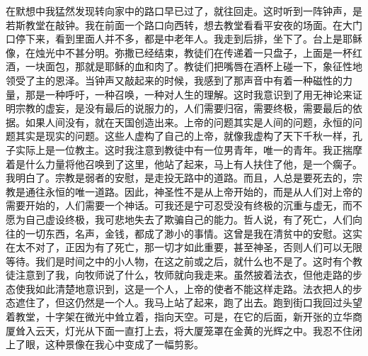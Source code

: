\documentclass[12pt,oneside]{book}
\begin{document}
在默想中我猛然发现转向家中的路口早已过了，就往回走。这时听到一阵钟声，是若斯教堂在敲钟。我在前面一个路口向西转，想去教堂看看平安夜的场面。在大门口停下来，看到里面人并不多，都是中老年人。我走到后排，坐下了。台上是耶稣像，在烛光中不甚分明。弥撒已经结束，教徒们在传递着一只盘子，上面是一杯红酒，一块面包，那就是耶稣的血和肉了。教徒们把嘴唇在酒杯上碰一下，象征性地领受了主的恩泽。当钟声又敲起来的时候，我感到了那声音中有着一种磁性的力量，那是一种呼吁，一种召唤，一种对人生的理解。这时我意识到了用无神论来证明宗教的虚妄，是没有最后的说服力的，人们需要归宿，需要终极，需要最后的依据。如果人间没有，就在天国创造出来。上帝的问题其实是人间的问题，永恒的问题其实是现实的问题。这些人虚构了自己的上帝，就像我虚构了天下千秋一样，孔子实际上是一位教主。这时我注意到教徒中有一位男青年，唯一的青年。我正揣摩着是什么力量将他召唤到了这里，他站了起来，马上有人扶住了他，是一个瘸子。我明白了。宗教是弱者的安慰，是走投无路中的道路。而且，人总是要死去的，宗教是通往永恒的唯一道路。因此，神圣性不是从上帝开始的，而是从人们对上帝的需要开始的，人们需要一个神话。可我还是宁可忍受没有终极的沉重与虚无，而不愿为自己虚设终极，我可悲地失去了欺骗自己的能力。哲人说，有了死亡，人们向往的一切东西，名声，金钱，都成了渺小的事情。这曾是我在清贫中的安慰。这实在太不对了，正因为有了死亡，那一切才如此重要，甚至神圣，否则人们可以无限等待。我们是时间之中的小人物，在这之前或之后，就什么也不是了。这时有个教徒注意到了我，向牧师说了什么，牧师就向我走来。虽然披着法衣，但他走路的步态使我如此清楚地意识到，这是一个人，上帝的使者不能这样走路。法衣把人的步态遮住了，但这仍然是一个人。我马上站了起来，跑了出去。跑到街口我回过头望着教堂，十字架在微光中耸立着，指向天空。可是，在它的后面，新开张的立华商厦耸入云天，灯光从下面一直打上去，将大厦笼罩在金黄的光辉之中。我忍不住闭上了眼，这种景像在我心中变成了一幅剪影。
\end{document}
